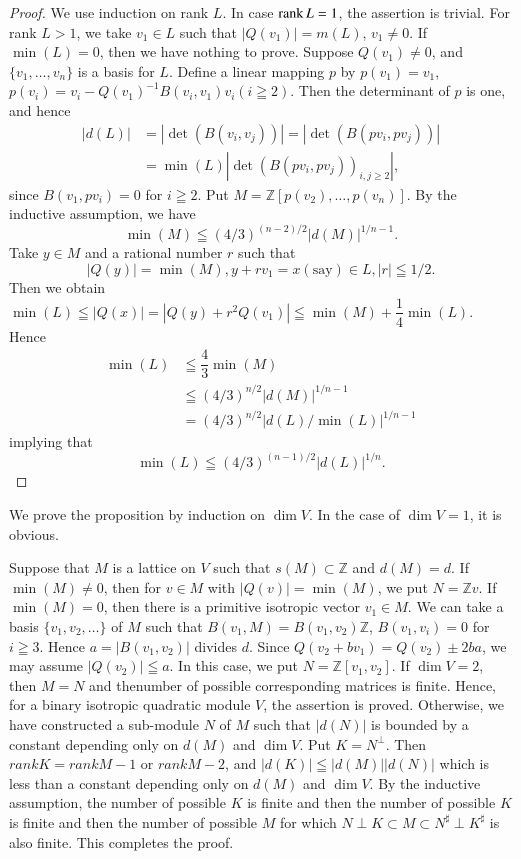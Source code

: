 \begin{proof}
We use induction on rank $L$. In case $\operatorname{rank} L=1$, the assertion is
trivial. For rank $L>1$, we take $v_{1}\in L$ such that
$|Q(v_{1})|=m(L)$, $v_{1}\neq 0$. If $\min (L)=0$, then\pageoriginale
we have nothing to prove. Suppose $Q(v_{1})\neq 0$, and
$\{v_{1},\ldots,v_{n}\}$ is a basis for $L$. Define a linear mapping
$p$ by $p(v_{1})=v_{1}$,
$p(v_{i})=v_{i}-Q(v_{1})^{-1}B(v_{i},v_{1})v_{i}(i\geqq 2)$. Then the
determinant of $p$ is one, and hence
\begin{align*}
|d(L)|&=|\det(B(v_{i},v_{j}))|=|\det(B(pv_{i},pv_{j}))|\\
&=\min(L)|\det(B(pv_{i},pv_{j}))_{i,j\geq  2}|, 
\end{align*}
since $B(v_{1},pv_{i})=0$ for $i\geqq 2$. Put
$M=\mathbb{Z}[p(v_{2}),\ldots,p(v_{n})]$. By the inductive assumption,
we have
$$
\min(M)\leqq (4/3)^{(n-2)/2}|d(M)|^{1/n-1}.
$$
Take $y\in M$ and a rational number $r$ such that
$$
|Q(y)|=\min(M), y+rv_{1}=x(\text{say})\in L,|r|\leqq 1/2.
$$
Then we obtain $\min(L)\leqq |Q(x)|=|Q(y)+r^{2}Q(v_{1})|\leqq
\min(M)+\dfrac{1}{4}\min(L)$.  Hence
\begin{align*}
\min(L) & \leqq \dfrac{4}{3}\min(M)\\
        & \leqq (4/3)^{n/2}|d(M)|^{1/n-1}\\
        & =(4/3)^{n/2}|d(L)/\min(L)|^{1/n-1}
\end{align*}
implying that
$$
\min(L)\leqq (4/3)^{(n-1)/2}|d(L)|^{1/n}.
$$
\end{proof}

We prove the proposition by induction on $\dim V$. In the case of
$\dim V=1$, it is obvious.

Suppose that $M$ is a lattice on $V$ such that $s(M)\subset\mathbb{Z}$
and $d(M)=d$. If $\min(M)\neq 0$, then for $v\in M$ with
$|Q(v)|=\min(M)$, we put $N=\mathbb{Z}v$. If $\min(M)=0$, then there
is a primitive isotropic vector $v_{1}\in M$. We can take a basis
$\{v_{1},v_{2},\ldots\}$ of $M$ such that
$B(v_{1},M)=B(v_{1},v_{2})\mathbb{Z}$, $B(v_{1},v_{i})=0$ for $i\geqq
3$. Hence $a=|B(v_{1},v_{2})|$ divides $d$. Since
$Q(v_{2}+bv_{1})=Q(v_{2})\pm 2ba$, we may assume $|Q(v_{2})|\leqq
a$. In this case, we put $N=\mathbb{Z}[v_{1},v_{2}]$. If $\dim V=2$,
then $M=N$ and 
the\pageoriginale number of possible corresponding matrices is
finite. Hence, for a binary isotropic quadratic module $V$, the
assertion is proved. Otherwise, we have constructed a sub-module $N$
of $M$ such that $|d(N)|$ is bounded by a constant depending only on
$d(M)$ and $\dim V$. Put $K=N^{\perp}$. Then $rank K = rank M-1$ or
$rank M-2$, and $|d(K)| \leqq |d(M)| |d(N)|$ which is less than a
constant depending only on $d(M)$ and $\dim V$. By the inductive
assumption, the number of possible $K$ is finite and then the number
of possible $K$ is finite and then the number of possible $M$ for
which $N\perp K\subset M \subset N^{\sharp} \perp K^{\sharp}$ is also
finite. This completes the proof. 

